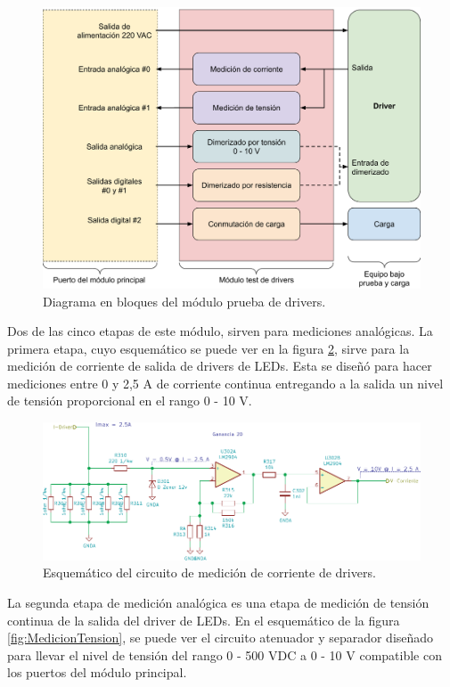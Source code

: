 \begin{figure}[H]
	\centering
	\includegraphics[width=1\textwidth]{./Figures/BloquesTestDriver.pdf}
	\caption{Diagrama en bloques del módulo prueba de drivers.}
	\label{fig:BloquesTestDriver}
\end{figure}


Dos de las cinco etapas de este módulo, sirven para mediciones analógicas. La primera etapa, cuyo esquemático se puede ver en la figura \ref{fig:MedicionCorriente}, sirve para la medición de corriente de salida de drivers de LEDs. Esta se diseñó para hacer mediciones entre 0 y 2,5 A de corriente continua entregando a la salida un nivel de tensión proporcional en el rango 0 - 10 V.

\begin{figure}[H]
	\centering
	\includegraphics[width=1\textwidth]{./Figures/MedicionCorriente.pdf}
	\caption{Esquemático del circuito de medición de corriente de drivers.}
	\label{fig:MedicionCorriente}
\end{figure}

La segunda etapa de medición analógica es una etapa de medición de tensión continua de la salida del driver de LEDs. En el esquemático de la figura \ref{fig:MedicionTension}, se puede ver el circuito atenuador y separador diseñado para llevar el nivel de tensión del rango 0 - 500 VDC a 0 - 10 V compatible con los puertos del módulo principal.

